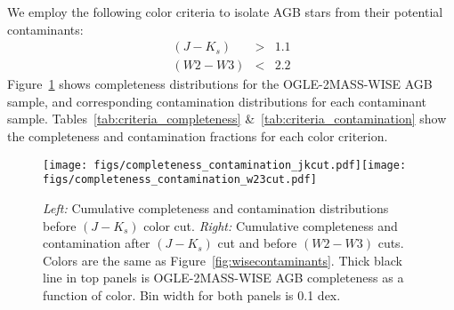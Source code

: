 We employ the following color criteria to isolate AGB stars from their potential contaminants:
\begin{eqnarray}
(J - K_s) &>& 1.1\\
(W2 - W3) &<&  2.2
\end{eqnarray}
\noindent Figure~\ref{fig:colorcuts} shows completeness distributions for the OGLE-2MASS-WISE AGB sample, and corresponding contamination distributions for each contaminant sample. Tables~\ref{tab:criteria_completeness} \&~\ref{tab:criteria_contamination} show the completeness and contamination fractions for each color criterion. 

\begin{figure}[h]
\texttt{[image: figs/completeness\_contamination\_jkcut.pdf]}\texttt{[image: figs/completeness\_contamination\_w23cut.pdf]}
\caption{\emph{Left:} Cumulative completeness and contamination distributions before $(J-K_s)$ color cut. \emph{Right:} Cumulative completeness and contamination after $(J-K_s)$ cut and before $(W2-W3)$ cuts. Colors are the same as Figure~\ref{fig:wisecontaminants}. Thick black line in top panels is OGLE-2MASS-WISE AGB completeness as a function of color. Bin width for both panels is 0.1 dex. \label{fig:colorcuts}}
\end{figure}

\begin{table}[h]
	\begin{center}
	\caption{Sample completeness with respect to each successive cut on WISE-2MASS color.\label{tab:criteria_completeness}}
	\end{center}
	
\end{table}
\begin{table}[h]
	\begin{center}
	\caption{Sample contamination with respect to each successive cut on WISE-2MASS color.\label{tab:criteria_contamination}}
	\end{center}
\end{table}

